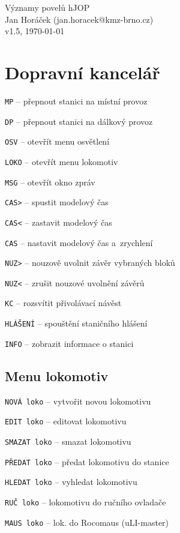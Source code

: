 \documentclass[12pt,a4paper,landscape]{article}
\begin{document}
\begin{multicols}{3}

\begin{center}
\LARGE Významy povelů hJOP\\
\small Jan Horáček (jan.horacek@kmz-brno.cz)\\
v1.5, \today
\end{center}

\section{Dopravní kancelář}
\begin{compactitem}
	\item \texttt{MP} -- přepnout stanici na místní provoz
	\item \texttt{DP} -- přepnout stanici na dálkový provoz
	\item \texttt{OSV} -- otevřít menu osvětlení
	\item \texttt{LOKO} -- otevřít menu lokomotiv
	\item \texttt{MSG} -- otevřít okno zpráv
	\item \texttt{CAS>} -- spustit modelový čas
	\item \texttt{CAS<} -- zastavit modelový čas
	\item \texttt{CAS} -- nastavit modelový čas	a~zrychlení
	\item \texttt{NUZ>} -- nouzově uvolnit závěr vybraných bloků
	\item \texttt{NUZ<} -- zrušit nouzové uvolnění závěrů
	\item \texttt{KC} -- rozsvítit přivolávací návěst
	\item \texttt{HLÁŠENÍ} -- spouštění staničního hlášení	
	\item \texttt{INFO} -- zobrazit informace o stanici
\end{compactitem}

\subsection{Menu lokomotiv}
\begin{compactitem}
	\item \texttt{NOVÁ loko} -- vytvořit novou lokomotivu
	\item \texttt{EDIT loko} -- editovat lokomotivu
	\item \texttt{SMAZAT loko} -- smazat lokomotivu
	\item \texttt{PŘEDAT loko} -- předat lokomotivu do stanice
	\item \texttt{HLEDAT loko} -- vyhledat lokomotivu
	\item \texttt{RUČ loko} -- lokomotivu do ručního ovladače
	\item \texttt{MAUS loko} -- lok. do Rocomaus (uLI-master)
\end{compactitem}


\end{multicols}
\end{document}
